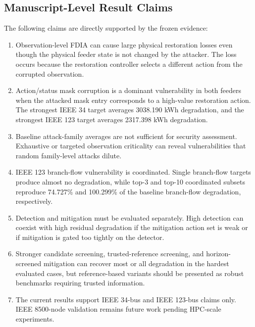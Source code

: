 \subsection{Manuscript-Level Result Claims}
\label{subsec:manuscript_level_claims}

The following claims are directly supported by the frozen evidence:

\begin{enumerate}
    \item Observation-level FDIA can cause large physical restoration losses even though the physical feeder state is not changed by the attacker. The loss occurs because the restoration controller selects a different action from the corrupted observation.
    \item Action/status mask corruption is a dominant vulnerability in both feeders when the attacked mask entry corresponds to a high-value restoration action. The strongest IEEE 34 target averages 3038.190 kWh degradation, and the strongest IEEE 123 target averages 2317.398 kWh degradation.
    \item Baseline attack-family averages are not sufficient for security assessment. Exhaustive or targeted observation criticality can reveal vulnerabilities that random family-level attacks dilute.
    \item IEEE 123 branch-flow vulnerability is coordinated. Single branch-flow targets produce almost no degradation, while top-3 and top-10 coordinated subsets reproduce 74.727\% and 100.299\% of the baseline branch-flow degradation, respectively.
    \item Detection and mitigation must be evaluated separately. High detection can coexist with high residual degradation if the mitigation action set is weak or if mitigation is gated too tightly on the detector.
    \item Stronger candidate screening, trusted-reference screening, and horizon-screened mitigation can recover most or all degradation in the hardest evaluated cases, but reference-based variants should be presented as robust benchmarks requiring trusted information.
    \item The current results support IEEE 34-bus and IEEE 123-bus claims only. IEEE 8500-node validation remains future work pending HPC-scale experiments.
\end{enumerate}

